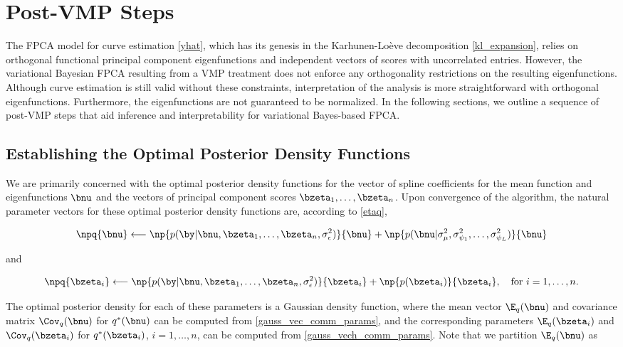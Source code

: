 \documentclass[12pt]{article}
\def\sigsqeps{\sigma^2_{\epsilon}}
\def\sigsqmu{\sigma^2_{\mu}}
\newcommand\sigsqpsi[1]{\sigma^2_{\psi_{#1}}}
\theoremstyle{plain}
\theoremstyle{definition}
\theoremstyle{remark}
\begin{document}

\section{Post-VMP Steps}
\label{sec:post_vmp_steps}

The FPCA model for curve estimation \eqref{yhat}, which has its genesis in the Karhunen-Lo\`{e}ve decomposition
\eqref{kl_expansion}, relies on orthogonal functional principal component
eigenfunctions and independent vectors of scores with uncorrelated entries.
However, the variational Bayesian FPCA resulting from a VMP treatment
does not enforce any orthogonality restrictions on the resulting eigenfunctions. Although curve estimation is still
valid without these constraints, interpretation of the analysis is more straightforward with orthogonal
eigenfunctions. Furthermore, the eigenfunctions are not guaranteed to be normalized.
In the following sections, we outline
a sequence of post-VMP steps that aid inference and interpretability for variational Bayes-based FPCA.


\subsection{Establishing the Optimal Posterior Density Functions}
\label{sec:opt_dens_funcs}

We are primarily concerned with the optimal posterior density functions for the vector of spline coefficients for
the mean function and eigenfunctions $\bnu$ and the vectors of principal component scores $\bzeta_1, \dots,
\bzeta_n$. Upon convergence of the algorithm, the natural parameter vectors for these optimal posterior density
functions are, according to \eqref{etaq},

\[
	\npq{\bnu} \longleftarrow
		\np{p (\by | \bnu, \bzeta_1, \dots, \bzeta_n, \sigsqeps)}{\bnu}
		+ \np{p (\bnu | \sigsqmu, \sigsqpsi{1}, \dots, \sigsqpsi{L})}{\bnu}
\]

\noindent and

\[
	\npq{\bzeta_i} \longleftarrow
		\np{p (\by | \bnu, \bzeta_1, \dots, \bzeta_n, \sigsqeps)}{\bzeta_i}
		+ \np{p (\bzeta_i)}{\bzeta_i}, \quad
	\text{for $i = 1, \dots, n$.}
\]

\noindent The optimal posterior density for each of these parameters is a Gaussian density
function, where the mean vector $\E_q (\bnu)$ and covariance matrix $\Cov_q (\bnu)$ for $q^* (\bnu)$
can be computed from
\eqref{gauss_vec_comm_params}, and the corresponding parameters $\E_q (\bzeta_i)$ and $\Cov_q (\bzeta_i)$
for $q^* (\bzeta_i)$, $i = 1, \dots, n$, can be
computed from \eqref{gauss_vech_comm_params}. Note that we partition $\E_q (\bnu)$ as
\end{document}
